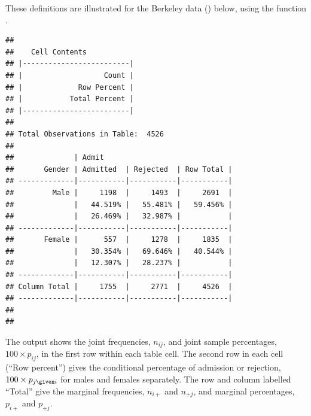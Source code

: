 \documentclass[11pt]{book}
\renewenvironment{knitrout}{\small\renewcommand{\baselinestretch}{.85}}{} %
\begin{document}
These definitions are illustrated
for the Berkeley data () below,
using the function .
\begin{knitrout}
\color{fgcolor}\begin{kframe}
\begin{alltt}
 \hlkwb{<-}  \hlopt{:}\hlstd{)}
 \hlstd{=}\hlstd{,} \hlstd{=}\hlstd{,} \hlstd{=}\hlstd{)}
\end{alltt}
\begin{verbatim}
## 
##    Cell Contents
## |-------------------------|
## |                   Count |
## |             Row Percent |
## |           Total Percent |
## |-------------------------|
## 
## Total Observations in Table:  4526 
## 
##              | Admit 
##       Gender | Admitted  | Rejected  | Row Total | 
## -------------|-----------|-----------|-----------|
##         Male |     1198  |     1493  |     2691  | 
##              |   44.519% |   55.481% |   59.456% | 
##              |   26.469% |   32.987% |           | 
## -------------|-----------|-----------|-----------|
##       Female |      557  |     1278  |     1835  | 
##              |   30.354% |   69.646% |   40.544% | 
##              |   12.307% |   28.237% |           | 
## -------------|-----------|-----------|-----------|
## Column Total |     1755  |     2771  |     4526  | 
## -------------|-----------|-----------|-----------|
## 
## 
\end{verbatim}
\end{kframe}
\end{knitrout}
The output shows the joint frequencies, $n_{ij}$, and joint sample percentages,
$100 \times p_{ij}$, in the first row within each table cell.
The second row in each cell (``Row percent'')
gives the conditional percentage of admission or rejection,
$100 \times p_{j\given i}$ for males and females separately.
The row and column labelled ``Total'' give the
marginal frequencies, $n_{i+}$ and $n_{+j}$,
and marginal percentages, $p_{i+}$ and $p_{+j}$.


\end{document}
